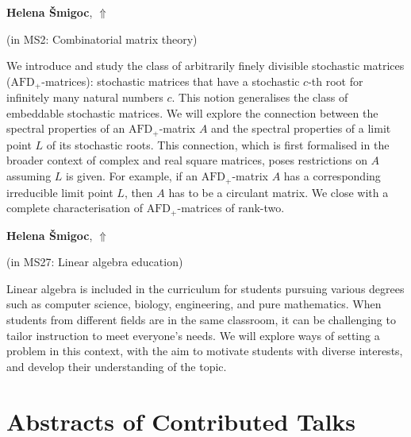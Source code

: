 \documentclass[ILAS2025-program.tex]{subfiles}
\begin{document}
     \hypertarget{down0263}{}\begin{ilasabstract}
    
    \textbf{Helena Šmigoc},  \hfill \hyperlink{up0263}{$\Uparrow$}
    
    (in {\color{mstitle}MS2: Combinatorial matrix theory})
        
        \mtskip
    We introduce and study the class of arbitrarily finely divisible stochastic matrices ($\mathrm{AFD}_+$-matrices): stochastic matrices that have a stochastic $c$-th root for infinitely many natural numbers $c$. This notion generalises the class of embeddable stochastic matrices. 
We will explore the connection between the spectral properties of an  $\mathrm{AFD}_+$-matrix $A$ and the spectral properties of a limit point $L$ of its stochastic roots. This connection, which is first formalised in the broader context of complex and real square matrices, poses restrictions on $A$ assuming $L$ is given. For example, if an $\mathrm{AFD}_+$-matrix $A$ has a corresponding irreducible limit point $L$, then $A$ has to be a circulant matrix. We close with a complete characterisation of $\mathrm{AFD}_+$-matrices of rank-two.\end{ilasabstract}
     \hypertarget{down0331}{}\begin{ilasabstract}
    
    \textbf{Helena Šmigoc},  \hfill \hyperlink{up0331}{$\Uparrow$}
    
    (in {\color{mstitle}MS27: Linear algebra education})
        
        \mtskip
    Linear algebra is included in the curriculum for students pursuing various degrees such as computer science, biology, engineering, and pure mathematics. When students from different fields are in the same classroom, it can be challenging to tailor instruction to meet everyone's needs.  We will explore ways of setting a problem in this context, with the aim to motivate students with diverse interests, and  develop their understanding of the topic.
\end{ilasabstract}
    \newpage

\section{Abstracts of Contributed Talks}
\newpage
\end{document}
